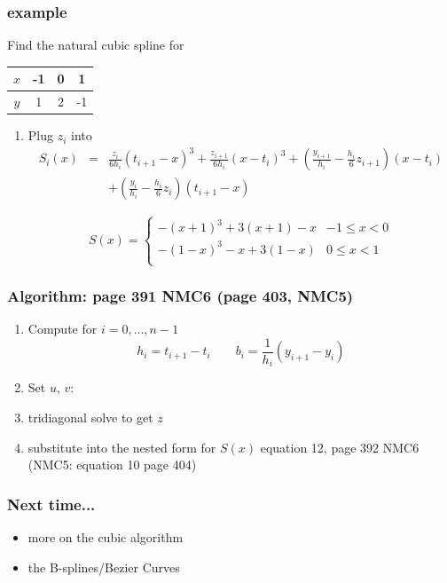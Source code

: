 \documentclass[10pt]{beamer}
\begin{document}
\begin{frame}
\frametitle{example}
Find the natural cubic spline for 
\begin{tabular}{c | c c c }
$x$ & -1 & 0 & 1\\\hline
$y$ & 1 & 2 & -1\\
\end{tabular}
\begin{enumerate}
  \item Plug $z_i$ into
\begin{eqnarray*}
  S_i(x) &=& \frac{z_i}{6h_i}(t_{i+1}-x)^3
+\frac{z_{i+1}}{6h_i}(x-t_i)^3 
+\left(\frac{y_{i+1}}{h_i} - \frac{h_i}{6}z_{i+1}\right)(x-t_i)\\
&&+\left(\frac{y_i}{h_i} - \frac{h_i}{6}z_i\right) (t_{i+1}-x)
\end{eqnarray*}
\bigskip

\begin{equation*}
  S(x) = \begin{cases}
    -(x+1)^3 + 3(x+1)-x& -1\leq x < 0\\ 
    -(1-x)^3 -x +3(1-x)& 0\leq x < 1\\ 
\end{cases}
\end{equation*}
\end{enumerate}
\end{frame}
\begin{frame}
\frametitle{Algorithm: page 391 NMC6 (page 403, NMC5)}
\begin{enumerate}
  \item Compute for $i=0,\dots,n-1$
  \begin{equation*}
  h_i=t_{i+1}-t_i\qquad b_i=\frac{1}{h_i}(y_{i+1}-y_{i})
  \end{equation*}
  \item Set $u$, $v$:
  \item tridiagonal solve to get $z$
  \item substitute into the nested form for $S(x)$ equation 12, page 392 NMC6 (NMC5: equation 10 page 404)
\end{enumerate}
\end{frame}
\begin{frame}
\frametitle{Next time...}
  \begin{itemize}
  \item more on the cubic algorithm
  \item the B-splines/Bezier Curves
\end{itemize}
\end{frame}
\end{document}
